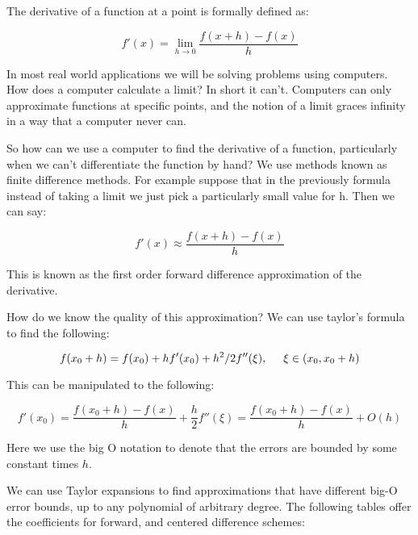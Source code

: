 

The derivative of a function at a point is formally defined as:

\[
f'(x) = \lim_{h\rightarrow 0} \frac{f(x + h)-f(x)}{h}
\]

In most real world applications we will be solving problems using computers. How does a computer calculate a limit? In short it can't. Computers can only approximate functions at specific points, and the notion of a limit graces infinity in a way that a computer never can.

So how can we use a computer to find the derivative of a function, particularly when we can't differentiate the function by hand? We use methods known as finite difference methods. For example suppose that in the previously formula instead of taking a limit we just pick a particularly small value for h. Then we can say:

\[
f'(x) \approx \frac{f(x + h)-f(x)}{h}
\]

This is known as the first order forward difference approximation of the derivative.

How do we know the quality of this approximation? We can use taylor's formula to find the following:

\[
f(x_0 + h) = f(x_0) + hf'(x_0) + h^2/2 f''(\xi),\hspace{5mm} \xi \in (x_0,x_0 + h)
\]

This can be manipulated to the following:

\[
f'(x_0) = \frac{f(x_0 + h) - f(x)}{h} + \frac{h}{2}
f''(\xi) = \frac{f(x_0 + h) - f(x)}{h} + O(h)
\]

Here we use the big O notation to denote that the errors are bounded by some constant times $h$.

We can use Taylor expansions to find approximations that have different big-O error bounds, up to any polynomial of arbitrary degree. The following tables offer the coefficients for forward, and centered difference schemes:

